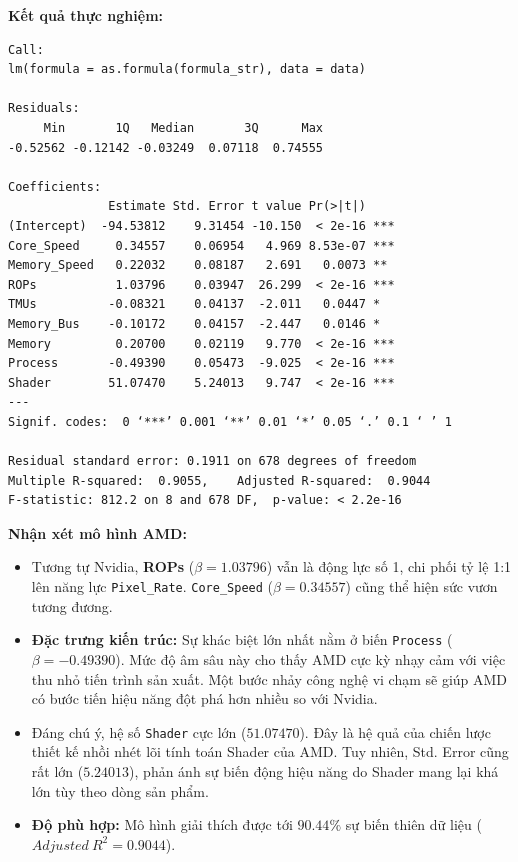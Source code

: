 \textbf{Kết quả thực nghiệm:}
\begin{center}
\begin{minipage}{0.85\textwidth}
\begin{mdframed}
\begin{verbatim}
Call:
lm(formula = as.formula(formula_str), data = data)

Residuals:
     Min       1Q   Median       3Q      Max 
-0.52562 -0.12142 -0.03249  0.07118  0.74555 

Coefficients:
              Estimate Std. Error t value Pr(>|t|)    
(Intercept)  -94.53812    9.31454 -10.150  < 2e-16 ***
Core_Speed     0.34557    0.06954   4.969 8.53e-07 ***
Memory_Speed   0.22032    0.08187   2.691   0.0073 ** 
ROPs           1.03796    0.03947  26.299  < 2e-16 ***
TMUs          -0.08321    0.04137  -2.011   0.0447 *  
Memory_Bus    -0.10172    0.04157  -2.447   0.0146 *  
Memory         0.20700    0.02119   9.770  < 2e-16 ***
Process       -0.49390    0.05473  -9.025  < 2e-16 ***
Shader        51.07470    5.24013   9.747  < 2e-16 ***
---
Signif. codes:  0 ‘***’ 0.001 ‘**’ 0.01 ‘*’ 0.05 ‘.’ 0.1 ‘ ’ 1

Residual standard error: 0.1911 on 678 degrees of freedom
Multiple R-squared:  0.9055,    Adjusted R-squared:  0.9044 
F-statistic: 812.2 on 8 and 678 DF,  p-value: < 2.2e-16
\end{verbatim}
\end{mdframed}
\end{minipage}
\end{center}

\textbf{Nhận xét mô hình AMD:} 
\begin{itemize}
    \item Tương tự Nvidia, \textbf{ROPs} ($\beta = 1.03796$) vẫn là động lực số 1, chi phối tỷ lệ 1:1 lên năng lực \texttt{Pixel\_Rate}. \texttt{Core\_Speed} ($\beta = 0.34557$) cũng thể hiện sức vươn tương đương.
    \item \textbf{Đặc trưng kiến trúc:} Sự khác biệt lớn nhất nằm ở biến \texttt{Process} ($\beta = -0.49390$). Mức độ âm sâu này cho thấy AMD cực kỳ nhạy cảm với việc thu nhỏ tiến trình sản xuất. Một bước nhảy công nghệ vi chạm sẽ giúp AMD có bước tiến hiệu năng đột phá hơn nhiều so với Nvidia.
    \item Đáng chú ý, hệ số \texttt{Shader} cực lớn ($51.07470$). Đây là hệ quả của chiến lược thiết kế nhồi nhét lõi tính toán Shader của AMD. Tuy nhiên, Std. Error cũng rất lớn ($5.24013$), phản ánh sự biến động hiệu năng do Shader mang lại khá lớn tùy theo dòng sản phẩm.
    \item \textbf{Độ phù hợp:} Mô hình giải thích được tới $90.44\%$ sự biến thiên dữ liệu ($Adjusted\ R^2 = 0.9044$).
\end{itemize}
